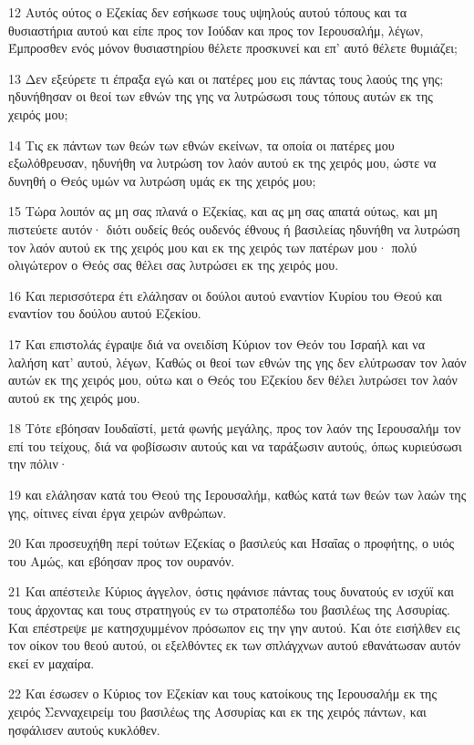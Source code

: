 \par 12 Αυτός ούτος ο Εζεκίας δεν εσήκωσε τους υψηλούς αυτού τόπους και τα θυσιαστήρια αυτού και είπε προς τον Ιούδαν και προς τον Ιερουσαλήμ, λέγων, Έμπροσθεν ενός μόνον θυσιαστηρίου θέλετε προσκυνεί και επ' αυτό θέλετε θυμιάζει;
\par 13 Δεν εξεύρετε τι έπραξα εγώ και οι πατέρες μου εις πάντας τους λαούς της γης; ηδυνήθησαν οι θεοί των εθνών της γης να λυτρώσωσι τους τόπους αυτών εκ της χειρός μου;
\par 14 Τις εκ πάντων των θεών των εθνών εκείνων, τα οποία οι πατέρες μου εξωλόθρευσαν, ηδυνήθη να λυτρώση τον λαόν αυτού εκ της χειρός μου, ώστε να δυνηθή ο Θεός υμών να λυτρώση υμάς εκ της χειρός μου;
\par 15 Τώρα λοιπόν ας μη σας πλανά ο Εζεκίας, και ας μη σας απατά ούτως, και μη πιστεύετε αυτόν· διότι ουδείς θεός ουδενός έθνους ή βασιλείας ηδυνήθη να λυτρώση τον λαόν αυτού εκ της χειρός μου και εκ της χειρός των πατέρων μου· πολύ ολιγώτερον ο Θεός σας θέλει σας λυτρώσει εκ της χειρός μου.
\par 16 Και περισσότερα έτι ελάλησαν οι δούλοι αυτού εναντίον Κυρίου του Θεού και εναντίον του δούλου αυτού Εζεκίου.
\par 17 Και επιστολάς έγραψε διά να ονειδίση Κύριον τον Θεόν του Ισραήλ και να λαλήση κατ' αυτού, λέγων, Καθώς οι θεοί των εθνών της γης δεν ελύτρωσαν τον λαόν αυτών εκ της χειρός μου, ούτω και ο Θεός του Εζεκίου δεν θέλει λυτρώσει τον λαόν αυτού εκ της χειρός μου.
\par 18 Τότε εβόησαν Ιουδαϊστί, μετά φωνής μεγάλης, προς τον λαόν της Ιερουσαλήμ τον επί του τείχους, διά να φοβίσωσιν αυτούς και να ταράξωσιν αυτούς, όπως κυριεύσωσι την πόλιν·
\par 19 και ελάλησαν κατά του Θεού της Ιερουσαλήμ, καθώς κατά των θεών των λαών της γης, οίτινες είναι έργα χειρών ανθρώπων.
\par 20 Και προσευχήθη περί τούτων Εζεκίας ο βασιλεύς και Ησαΐας ο προφήτης, ο υιός του Αμώς, και εβόησαν προς τον ουρανόν.
\par 21 Και απέστειλε Κύριος άγγελον, όστις ηφάνισε πάντας τους δυνατούς εν ισχύϊ και τους άρχοντας και τους στρατηγούς εν τω στρατοπέδω του βασιλέως της Ασσυρίας. Και επέστρεψε με κατησχυμμένον πρόσωπον εις την γην αυτού. Και ότε εισήλθεν εις τον οίκον του θεού αυτού, οι εξελθόντες εκ των σπλάγχνων αυτού εθανάτωσαν αυτόν εκεί εν μαχαίρα.
\par 22 Και έσωσεν ο Κύριος τον Εζεκίαν και τους κατοίκους της Ιερουσαλήμ εκ της χειρός Σενναχειρείμ του βασιλέως της Ασσυρίας και εκ της χειρός πάντων, και ησφάλισεν αυτούς κυκλόθεν.
